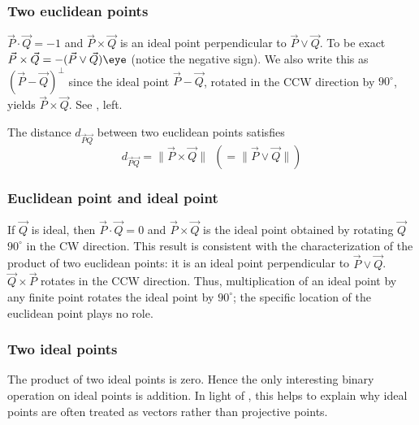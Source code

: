 \documentclass{birkjour}
\newcommand{\mydogblue}{{\color{gray} $\square$~~}}
\begin{document}
\subsubsection{Two euclidean points}   
\label{sec:twoeucpts}
$\vec{P} \cdot \vec{Q} = -1$ and $\vec{P} \times \vec{Q}$ is an ideal point perpendicular to $\vec{P} \vee \vec{Q}$. To be exact  $\vec{P} \times \vec{Q} = -(\vec{P} \vee \vec{Q})\eye$ (notice the negative sign). We also write this as $(\vec{P}-\vec{Q})^{\perp}$ since the ideal point $\vec{P} - \vec{Q}$, rotated in the CCW direction by $90^{\circ}$, yields $\vec{P}\times \vec{Q}$.   See , left. %
 
 \myexercise  The distance  $d_{\vec{P}\vec{Q}}$ between two euclidean points %
 satisfies \[d_{\vec{P}\vec{Q}} = \| \vec{P} \times \vec{Q} \| ~~(= \| \vec{P} \vee \vec{Q} \|)\]%


\subsubsection{Euclidean point and ideal point}  If $\vec{Q}$ is ideal, then $\vec{P} \cdot \vec{Q} = 0$ and $\vec{P} \times \vec{Q}$ is the ideal point obtained by rotating $\vec{Q}$ $90^{\circ}$ in the CW direction.  This result is consistent with the characterization of the product of two euclidean points: it is an ideal point perpendicular to $\vec{P} \vee \vec{Q}$. $\vec{Q} \times \vec{P}$ rotates in the CCW direction. Thus, multiplication of an ideal point by any finite point rotates the ideal point by $90^{\circ}$; the specific location of the euclidean point plays no role.  
  
\subsubsection{Two ideal points} The product of two ideal points is zero.  Hence the only interesting binary operation on ideal points is addition.  In light of , this helps to explain why ideal points are often treated as vectors rather than projective points.

\end{document}
